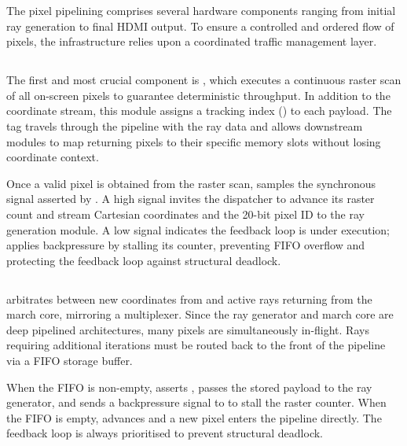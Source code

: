 The pixel pipelining comprises several hardware components ranging from initial
ray generation to final HDMI output. To ensure a controlled and ordered flow of
pixels, the infrastructure relies upon a coordinated traffic management layer.

\subsection{}

The first and most crucial component is , which executes a
continuous raster scan of all on-screen pixels to guarantee deterministic
throughput. In addition to the coordinate stream, this module assigns a tracking
index () to each payload. The tag travels through the pipeline with
the ray data and allows downstream modules to map returning pixels to their
specific memory slots without losing coordinate context.

Once a valid pixel is obtained from the raster scan, 
samples the synchronous  signal asserted by
. A high signal invites the dispatcher to advance its
raster count and stream Cartesian coordinates and the 20-bit pixel ID to the
ray generation module. A low signal indicates the feedback loop is under
execution;  applies backpressure by stalling its counter,
preventing FIFO overflow and protecting the feedback loop against structural
deadlock.

\subsection{}

 arbitrates between new coordinates from
 and active rays returning from the march core, mirroring
a multiplexer. Since the ray generator and march core are deep pipelined
architectures, many pixels are simultaneously in-flight. Rays requiring
additional iterations must be routed back to the front of the pipeline via a
FIFO storage buffer.

When the FIFO is non-empty,  asserts ,
passes the stored payload to the ray generator, and sends a backpressure signal
to  to stall the raster counter. When the FIFO is empty,
 advances and a new pixel enters the pipeline directly.
The feedback loop is always prioritised to prevent structural deadlock.

